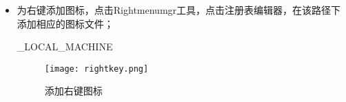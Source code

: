 \begin{itemize}
\item 为右键添加图标，点击Rightmenumgr工具，点击注册表编辑器，在该路径下添加相应的图标文件；
\begin{messagebox}
\HKEY_LOCAL_MACHINE\SOFTWARE\Classes\Directory\background\shell\Cmder
\end{messagebox}

\begin{figure}[H]
\centering
\texttt{[image: rightkey.png]}
\caption{添加右键图标}
\label{fig:rightkey}
\end{figure}

\end{itemize}

